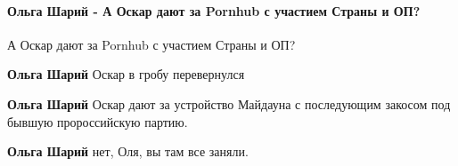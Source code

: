  
 
 
 
 
\paragraph{Ольга Шарий - А Оскар дают за Pornhub с участием Страны и ОП?}

\begin{itemize}
 
А Оскар дают за Pornhub с участием Страны и ОП?

\begin{itemize}
 
\textbf{Ольга Шарий} Оскар в гробу перевернулся

 
\textbf{Ольга Шарий} Оскар дают за устройство Майдауна с последующим закосом под бывшую пророссийскую партию.


 
\textbf{Ольга Шарий} нет, Оля, вы там все заняли.

 

\end{itemize}
\end{itemize}
